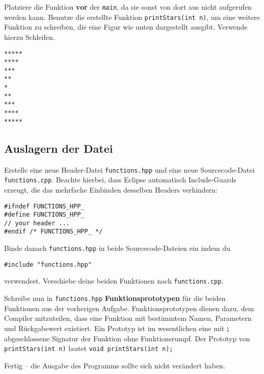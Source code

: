 Platziere die Funktion \textbf{vor} der \texttt{main}, da sie sonst von dort aus nicht aufgerufen werden kann.
Benutze die erstellte Funktion \texttt{printStars(int n)}, um eine weitere Funktion zu schreiben, die eine Figur wie unten dargestellt ausgibt.
Verwende hierzu Schleifen.
\begin{lstlisting}
*****
****
***
**
*
**
***
****
*****
\end{lstlisting}


\subsection{Auslagern der Datei}
Erstelle eine neue Header-Datei \texttt{functions.hpp} und eine neue Sourcecode-Datei \texttt{functions.cpp}. Beachte hierbei, dass Eclipse automatisch Include-Guards erzeugt, die das mehrfache Einbinden desselben Headers verhindern:
\begin{lstlisting}
#ifndef FUNCTIONS_HPP_
#define FUNCTIONS_HPP_
// your header ...
#endif /* FUNCTIONS_HPP_ */
\end{lstlisting}
Binde danach \texttt{functions.hpp} in beide Sourcecode-Dateien ein indem du
\begin{lstlisting}
#include "functions.hpp"
\end{lstlisting}
verwendest.
Verschiebe deine beiden Funktionen nach \texttt{functions.cpp}.

Schreibe nun in \texttt{functions.hpp} \textbf{Funktionsprototypen} für die beiden Funktionen aus der vorherigen Aufgabe.
Funktionsprototypen dienen dazu, dem Compiler mitzuteilen, dass eine Funktion mit bestimmtem Namen, Parametern und Rückgabewert existiert.
Ein Prototyp ist im wesentlichen eine mit \textbf{;} abgeschlossene Signatur der Funktion ohne Funktionsrumpf.
Der Prototyp von \texttt{printStars(int n)} lautet \texttt{void printStars(int n);}

Fertig -- die Ausgabe des Programms sollte sich nicht verändert haben.



